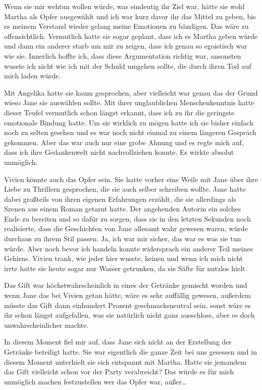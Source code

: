 \documentclass[11pt, a5paper]{article}
\newcommand{\te}{Jane } %
\newcommand{\gf}{Martha } %
\newcommand{\Gf}{Martha}
\newcommand{\ag}{Angelika } %
\newcommand{\vi}{Vivien } %
\begin{document}
\begin{spacing}{1.2}
		Wenn sie mir wehtun wollen würde, was eindeutig ihr Ziel war, hätte sie wohl \gf als Opfer ausgewählt und ich war kurz davor ihr das Mittel zu geben, bis es meinem Verstand wieder gelang meine Emotionen zu bändigen. Das wäre zu offensichtlich. Vermutlich hatte sie sogar geplant, dass ich es \gf geben würde und dann ein anderer starb um mir zu zeigen, dass ich genau so egoistisch war wie sie. Innerlich hoffte ich, dass diese Argumentation richtig war, ansonsten wusste ich nicht wie ich mit der Schuld umgehen sollte, die durch ihren Tod auf mich laden würde.
		
		Mit \ag hatte sie kaum gesprochen, aber vielleicht war genau das der Grund wieso \te sie auswählen sollte. Mit ihrer unglaublichen Menschenkenntnis hatte dieser Teufel vermutlich schon längst erkannt, dass ich zu ihr die geringste emotionale Bindung hatte. Um sie wirklich zu mögen hatte ich sie bisher einfach noch zu selten gesehen und es war noch nicht einmal zu einem längeren Gespräch gekommen. Aber das war auch nur eine grobe Ahnung und es regte mich auf, dass ich ihre Gedankenwelt nicht nachvollziehen konnte. Es wirkte absolut unmöglich.
		
		\vi könnte auch das Opfer sein. Sie hatte vorher eine Weile mit \te über ihre Liebe zu Thrillern gesprochen, die sie auch selber schreiben wollte. \te hatte dabei großteils von ihren eigenen Erfahrungen erzählt, die sie allerdings als Szenen aus einem Roman getarnt hatte. Der angehenden Autorin ein solches Ende zu bereiten und so dafür zu sorgen, dass sie in den letzten Sekunden noch realisierte, dass die Geschichten von \te allesamt wahr gewesen waren, würde durchaus zu ihrem Stil passen. Ja, ich war mir sicher, das war es was sie tun würde. Aber noch bevor ich handeln konnte widersprach ein anderer Teil meines Gehirns. \vi trank, wie jeder hier wusste, keinen und wenn ich mich nicht irrte hatte sie heute sogar nur Wasser getrunken, da sie Säfte für nutzlos hielt.
		
		Das Gift war höchstwahrscheinlich in eines der Getränke gemischt worden und wenn \te das bei \vi getan hätte, wäre es sehr auffällig gewesen, außerdem müsste das Gift dann einhundert Prozent geschmacksneutral sein, sonst wäre es ihr schon längst aufgefallen, was sie natürlich nicht ganz ausschloss, aber es doch unwahrscheinlicher machte.
		
		In diesem Moment fiel mir auf, dass \te sich nicht an der Erstellung der Getränke beteiligt hatte. Sie war eigentlich die ganze Zeit bei uns gesessen und in diesem Moment unterhielt sie sich entspannt mit \Gf . Hatte sie jemandem das Gift vielleicht schon vor der Party verabreicht? Das würde es für mich unmöglich machen festzustellen wer das Opfer war, außer…
		

\end{spacing}
\end{document}
